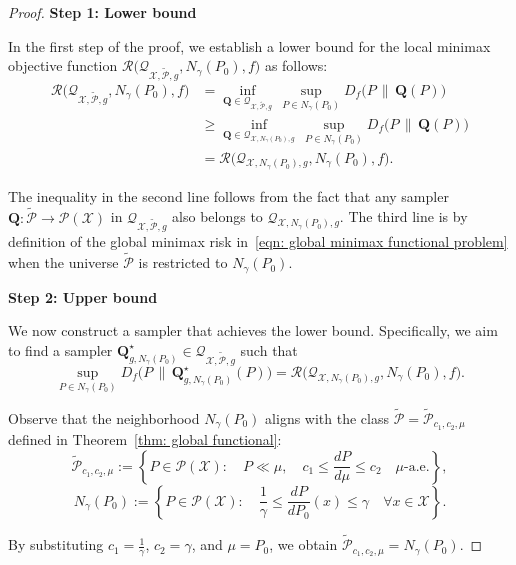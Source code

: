 \documentclass[accepted]{article}
\theoremstyle{plain} %
\theoremstyle{definition}
\theoremstyle{remark}
\newcommand{\bQ}{\mathbf{Q}}
\begin{document}
\begin{proof}
    \textbf{Step 1: Lower bound}

In the first step of the proof, we establish a lower bound for the local minimax objective function 
\(\mathcal{R}\big(\mathcal{Q}_{\mathcal{X},\tilde{\mathcal{P}},g},N_\gamma(P_0),f\big)\) as follows:
\begin{align} \label{eqn: lower bound local functional}
\mathcal{R}\big(\mathcal{Q}_{\mathcal{X},\tilde{\mathcal{P}},g},N_\gamma(P_0),f\big) 
&= \inf_{\bQ \in \mathcal{Q}_{\mathcal{X},\tilde{\mathcal{P}},g}} \, 
\sup_{P \in N_\gamma(P_0)} D_f\big(P \, \| \, \bQ(P)\big) \nonumber \\
&\geq \inf_{\bQ \in \mathcal{Q}_{\mathcal{X},N_\gamma(P_0),g}} \, 
\sup_{P \in N_\gamma(P_0)} D_f\big(P \, \| \, \bQ(P)\big) \nonumber \\
&= \mathcal{R}\big(\mathcal{Q}_{\mathcal{X},N_\gamma(P_0),g},N_\gamma(P_0),f\big).
\end{align}

The inequality in the second line follows from the fact that any sampler 
\(\bQ : \tilde{\mathcal{P}} \to \mathcal{P}(\mathcal{X})\) in 
\(\mathcal{Q}_{\mathcal{X}, \tilde{\mathcal{P}}, g}\) also belongs to 
\(\mathcal{Q}_{\mathcal{X}, N_\gamma(P_0), g}\). 
The third line is by definition of the global minimax risk in~\eqref{eqn: global minimax functional problem} when the universe $\mathcal{\tilde{P}}$ is restricted to \(N_\gamma(P_0)\).

\textbf{Step 2: Upper bound}

We now construct a sampler that achieves the lower bound. Specifically, we aim to find a sampler 
\(\bQ^\star_{g, N_\gamma(P_0)} \in \mathcal{Q}_{\mathcal{X}, \tilde{\mathcal{P}}, g}\) such that
\[
\sup_{P \in N_\gamma(P_0)} D_f\big(P \, \| \, \bQ^\star_{g, N_\gamma(P_0)}(P)\big) 
= \mathcal{R}\big(\mathcal{Q}_{\mathcal{X}, N_\gamma(P_0), g}, N_\gamma(P_0), f\big).
\]

Observe that the neighborhood \(N_\gamma(P_0)\) aligns with the class 
\(\tilde{\mathcal{P}} = \tilde{\mathcal{P}}_{c_1, c_2, \mu}\) defined in Theorem~\ref{thm: global functional}:
\[
\tilde{\mathcal{P}}_{c_1, c_2, \mu}
:= \left\{ P \in \mathcal{P}(\mathcal{X}) : \quad P \ll \mu, \quad 
c_1 \leq \frac{dP}{d\mu} \leq c_2 \quad \mu\text{-a.e.} \right\},
\]
\[
N_\gamma(P_0) := \left\{ P \in \mathcal{P}(\mathcal{X}) : \quad 
\frac{1}{\gamma} \leq \frac{dP}{dP_0}(x) \leq \gamma \quad \forall x \in \mathcal{X} \right\}.
\]

By substituting \(c_1 = \tfrac{1}{\gamma}\), \(c_2 = \gamma\), and \(\mu = P_0\), we obtain 
\(\tilde{\mathcal{P}}_{c_1, c_2, \mu} = N_\gamma(P_0)\).


\end{proof}
\end{document}
